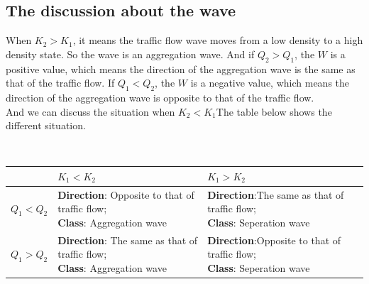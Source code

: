\documentclass[UTF8]{mcmthesis}
\begin{document}
\subsection{The discussion about the wave}
When $K_{2}>K_{1}$, it means the traffic flow wave moves from a low density to a high density state. So the wave is an aggregation wave. And if $ Q_{2}>Q_{1} $, the $W$ is a positive value, which means the direction of the aggregation wave is the same as that of the traffic flow. If $ Q_{1}<Q_{2} $, the $W$ is a negative value, which means the direction of the aggregation wave is opposite to that of the traffic flow. \\
\indent And we can discuss the situation when $K_{2}<K_{1}$The table below shows the different situation.\\
\begin{table}[H]
        \setlength{\abovecaptionskip}{0pt}
        \setlength{\belowcaptionskip}{0pt}
		\\
        \begin{tabular}{p{2.7cm}<{\centering}|p{5.5cm}<{\centering}|p{5.5cm}<{\centering}|}
		\hline
		\rowcolor[gray]{0.9}\bf{}	&\bf{$K_{1}<K_{2}$}&\bf{$K_{1}>K_{2}$}	\\
		\hline
		$ Q_{1}<Q_{2} $	 & \makecell[{}{p{5.5cm}}]{\textbf{Direction}: Opposite to that of traffic flow;\\  \textbf{Class}: Aggregation wave  } &\makecell[{}{p{5.5cm}}]{\textbf{Direction}:The same as that of traffic flow;\\ \textbf{Class}: Seperation wave}\\
		\hline
		$Q_{1}>Q_{2} $  & \makecell[{}{p{5.5cm}}]{\textbf{Direction}: The same as that of traffic flow;\\  \textbf{Class}: Aggregation wave  }  
		&\makecell[{}{p{5.5cm}}]{\textbf{Direction}:Opposite to that of traffic flow;\\ \textbf{Class}: Seperation wave}
	\end{tabular}
\end{table}
\end{document}
